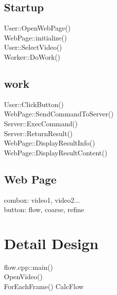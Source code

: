 \documentclass{article}
\begin{document}
\subsection{Startup}

User::OpenWebPage()\\
\indent WebPage::initialize()\\
\indent User::SelectVideo()\\
\indent Worker::DoWork()

\subsection{work}
User::ClickButton()\\
\indent WebPage::SendCommandToServer()\\
\indent Server::ExecCommand()\\
\indent Server::ReturnResult()\\
\indent \indent WebPage::DisplayResultInfo()\\
\indent \indent WebPage::DisplayResultContent()

\subsection{Web Page}

combox: video1, video2...\\
button: flow, coarse, refine

\section{Detail Design}
flow.cpp::main()\\
\indent OpenVideo()\\
\indent ForEachFrame()
\indent CalcFlow
\end{document}
